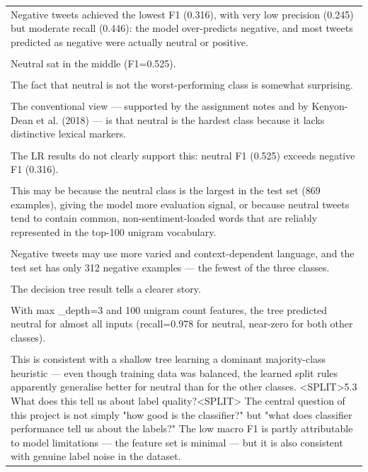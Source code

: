 \documentclass[11pt]{article}
\begin{document}
\begin{longtable}{|p{\dimexpr\linewidth-2\tabcolsep-2\arrayrulewidth\relax}|}
\hline
\rule{0pt}{3.5cm} \\
\hline
Negative tweets achieved the lowest F1 (0.316), with very low precision (0.245) but moderate recall (0.446): the model over-predicts negative, and most tweets predicted as negative were actually neutral or positive. \\[2pt]
\hline
\rule{0pt}{3.5cm} \\
\hline
Neutral sat in the middle (F1=0.525). \\[2pt]
\hline
\rule{0pt}{3.5cm} \\
\hline
The fact that neutral is not the worst-performing class is somewhat surprising. \\[2pt]
\hline
\rule{0pt}{3.5cm} \\
\hline
The conventional view --- supported by the assignment notes and by Kenyon-Dean et al. (2018) --- is that neutral is the hardest class because it lacks distinctive lexical markers. \\[2pt]
\hline
\rule{0pt}{3.5cm} \\
\hline
The LR results do not clearly support this: neutral F1 (0.525) exceeds negative F1 (0.316). \\[2pt]
\hline
\rule{0pt}{3.5cm} \\
\hline
This may be because the neutral class is the largest in the test set (869 examples), giving the model more evaluation signal, or because neutral tweets tend to contain common, non-sentiment-loaded words that are reliably represented in the top-100 unigram vocabulary. \\[2pt]
\hline
\rule{0pt}{3.5cm} \\
\hline
Negative tweets may use more varied and context-dependent language, and the test set has only 312 negative examples --- the fewest of the three classes. \\[2pt]
\hline
\rule{0pt}{3.5cm} \\
\hline
The decision tree result tells a clearer story. \\[2pt]
\hline
\rule{0pt}{3.5cm} \\
\hline
With max \_depth=3 and 100 unigram count features, the tree predicted neutral for almost all inputs (recall=0.978 for neutral, near-zero for both other classes). \\[2pt]
\hline
\rule{0pt}{3.5cm} \\
\hline
This is consistent with a shallow tree learning a dominant majority-class heuristic --- even though training data was balanced, the learned split rules apparently generalise better for neutral than for the other classes. <SPLIT>5.3 What does this tell us about label quality?<SPLIT> The central question of this project is not simply "how good is the classifier?" but "what does classifier performance tell us about the labels?" The low macro F1 is partly attributable to model limitations --- the feature set is minimal --- but it is also consistent with genuine label noise in the dataset. \\[2pt]

\end{longtable}
\end{document}
